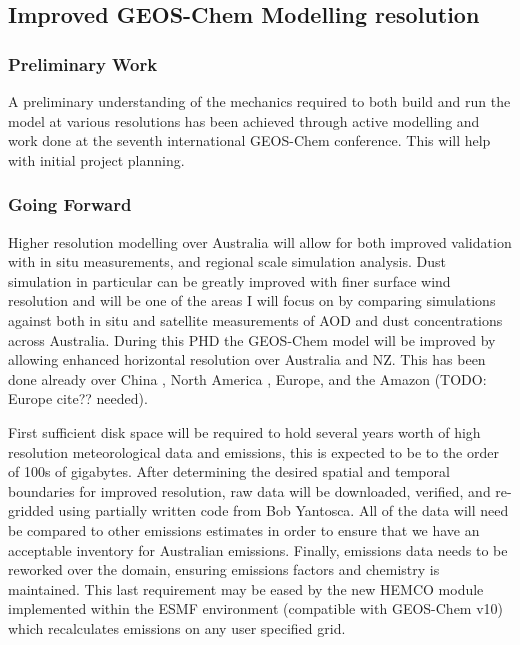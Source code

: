 \subsection{Improved GEOS-Chem Modelling resolution}
\subsubsection{Preliminary Work}
A preliminary understanding of the mechanics required to both build and run the model at various resolutions has been achieved through active modelling and work done at the seventh international GEOS-Chem conference.
This will help with initial project planning.

\subsubsection{Going Forward}
Higher resolution modelling over Australia will allow for both improved validation with in situ measurements, and regional scale simulation analysis. 
Dust simulation in particular can be greatly improved with finer surface wind resolution and will be one of the areas I will focus on by comparing simulations against both in situ and satellite measurements of AOD and dust concentrations across Australia.
During this PHD the GEOS-Chem model will be improved by allowing enhanced horizontal resolution over Australia and NZ.
This has been done already over China \cite{Chen_2009,Wang_2004}, North America \cite{Zhang_2012}, Europe, and the Amazon (TODO: Europe cite?? needed).

First sufficient disk space will be required to hold several years worth of high resolution meteorological data and emissions, this is expected to be to the order of 100s of gigabytes.
After determining the desired spatial and temporal boundaries for improved resolution, raw data will be downloaded, verified, and re-gridded using partially written code from Bob Yantosca.
All of the data will need be compared to other emissions estimates in order to ensure that we have an acceptable inventory for Australian emissions.
Finally, emissions data needs to be reworked over the domain, ensuring emissions factors and chemistry is maintained.
This last requirement may be eased by the new HEMCO module implemented within the ESMF environment (compatible with GEOS-Chem v10) which recalculates emissions on any user specified grid.
  